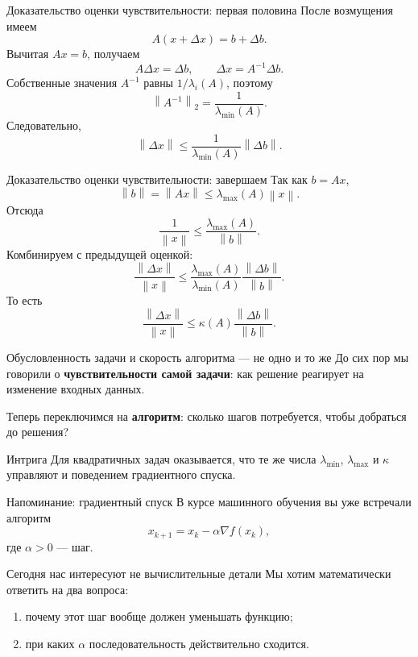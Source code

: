 \documentclass[aspectratio=169,10pt]{beamer}
\newcommand{\norm}[1]{\left\lVert #1\right\rVert}
\newcommand{\grad}{\nabla}
\newcommand{\lammin}{\lambda_{\min}}
\newcommand{\lammax}{\lambda_{\max}}
\newcommand{\kappaA}{\kappa(A)}
\begin{document}
\begin{frame}{Доказательство оценки чувствительности: первая половина}
\footnotesize
После возмущения имеем
\[
 A(x+\Delta x)=b+\Delta b.
\]
Вычитая $Ax=b$, получаем
\[
 A\Delta x=\Delta b,
 \qquad
 \Delta x=A^{-1}\Delta b.
\]
Собственные значения $A^{-1}$ равны $1/\lambda_i(A)$, поэтому
\[
 \norm{A^{-1}}_2=\frac1{\lammin(A)}.
\]
Следовательно,
\[
 \boxed{
 \norm{\Delta x}
 \le
 \frac1{\lammin(A)}\norm{\Delta b}.
 }
\]
\end{frame}

\begin{frame}{Доказательство оценки чувствительности: завершаем}
\footnotesize
Так как $b=Ax$,
\[
 \norm{b}=\norm{Ax}\le\lammax(A)\norm{x}.
\]
Отсюда
\[
 \frac1{\norm{x}}
 \le
 \frac{\lammax(A)}{\norm{b}}.
\]
Комбинируем с предыдущей оценкой:
\[
 \frac{\norm{\Delta x}}{\norm{x}}
 \le
 \frac{\lammax(A)}{\lammin(A)}
 \frac{\norm{\Delta b}}{\norm{b}}.
\]
То есть
\[
 \boxed{
 \frac{\norm{\Delta x}}{\norm{x}}
 \le
 \kappaA\frac{\norm{\Delta b}}{\norm{b}}.
 }
\]
\end{frame}

\begin{frame}{Обусловленность задачи и скорость алгоритма --- не одно и то же}
\small
До сих пор мы говорили о \textbf{чувствительности самой задачи}: как решение реагирует на изменение входных данных.

\vspace{0.6em}
Теперь переключимся на \textbf{алгоритм}: сколько шагов потребуется, чтобы добраться до решения?

\begin{alertblock}{Интрига}
Для квадратичных задач оказывается, что те же числа $\lammin$, $\lammax$ и $\kappa$ управляют и поведением градиентного спуска.
\end{alertblock}
\end{frame}

\begin{frame}{Напоминание: градиентный спуск}
\small
В курсе машинного обучения вы уже встречали алгоритм
\[
 \boxed{
 x_{k+1}=x_k-\alpha\grad f(x_k),
 }
\]
где $\alpha>0$ --- шаг.

\begin{block}{Сегодня нас интересуют не вычислительные детали}
Мы хотим математически ответить на два вопроса:
\begin{enumerate}
 \item почему этот шаг вообще должен уменьшать функцию;
 \item при каких $\alpha$ последовательность действительно сходится.
\end{enumerate}
\end{block}
\end{frame}
\end{document}
